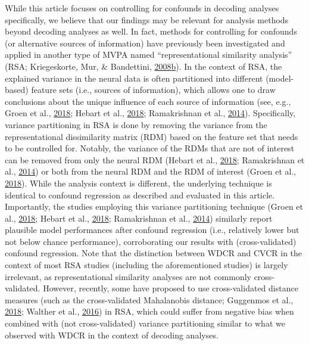 \documentclass[11pt,american,a4paper,oneside,]{memoir} %
\begin{document}
While this article focuses on controlling for confounds in decoding analyses specifically, we believe that our findings may be relevant for analysis methods beyond decoding analyses as well. In fact, methods for controlling for confounds (or alternative sources of information) have previously been investigated and applied in another type of MVPA named ``representational similarity analysis'' (RSA; Kriegeskorte, Mur, \& Bandettini, \protect\hyperlink{ref-kriegeskorte2008representational}{2008}\protect\hyperlink{ref-kriegeskorte2008representational}{b}). In the context of RSA, the explained variance in the neural data is often partitioned into different (model-based) feature sets (i.e., sources of information), which allows one to draw conclusions about the unique influence of each source of information (see, e.g., Groen et al., \protect\hyperlink{ref-Groen2018-qo}{2018}; Hebart et al., \protect\hyperlink{ref-Hebart2018-dz}{2018}; Ramakrishnan et al., \protect\hyperlink{ref-Ramakrishnan2014-ki}{2014}). Specifically, variance partitioning in RSA is done by removing the variance from the representational dissimilarity matrix (RDM) based on the feature set that needs to be controlled for. Notably, the variance of the RDMs that are not of interest can be removed from only the neural RDM (Hebart et al., \protect\hyperlink{ref-Hebart2018-dz}{2018}; Ramakrishnan et al., \protect\hyperlink{ref-Ramakrishnan2014-ki}{2014}) or both from the neural RDM and the RDM of interest (Groen et al., \protect\hyperlink{ref-Groen2018-qo}{2018}). While the analysis context is different, the underlying technique is identical to confound regression as described and evaluated in this article. Importantly, the studies employing this variance partitioning technique (Groen et al., \protect\hyperlink{ref-Groen2018-qo}{2018}; Hebart et al., \protect\hyperlink{ref-Hebart2018-dz}{2018}; Ramakrishnan et al., \protect\hyperlink{ref-Ramakrishnan2014-ki}{2014}) similarly report plausible model performances after confound regression (i.e., relatively lower but not below chance performance), corroborating our results with (cross-validated) confound regression. Note that the distinction between WDCR and CVCR in the context of most RSA studies (including the aforementioned studies) is largely irrelevant, as representational similarity analyses are not commonly cross-validated. However, recently, some have proposed to use cross-validated distance measures (such as the cross-validated Mahalanobis distance; Guggenmos et al., \protect\hyperlink{ref-Guggenmos2018-rr}{2018}; Walther et al., \protect\hyperlink{ref-Walther2016-je}{2016}) in RSA, which could suffer from negative bias when combined with (not cross-validated) variance partitioning similar to what we observed with WDCR in the context of decoding analyses.
\end{document}
